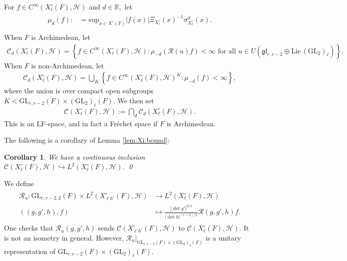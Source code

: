 \documentclass[12pt]{amsart}
\newtheorem{cor}[thm]{Corollary}
\theoremstyle{remark}
\numberwithin{equation}{section}
\newcommand{\GL}{\mathrm{GL}}
\newcommand{\lto}{\longrightarrow}
\newcommand{\RR}{\mathbb{R}}
\newcommand{\quash}[1]{}
\theoremstyle{definition}
\numberwithin{equation}{subsection}
\begin{document}
For $f \in C^\infty(X^\circ_\ell(F),\mathcal{H})$ and $d\in \RR,$ let 
\begin{align*}\begin{split}
    \mu_d(f):&=\mathrm{sup}_{x \in X^\circ(F)}|f(x)|\Xi_{X_\ell^\circ}(x)^{-1}\sigma_{X_\ell^\circ}^d(x).\\
   \quash{\mu_d'(f):&=\mathrm{sup}_{x \in X^\circ(F)}|f(x)|\Xi_{X_\ell^\circ}'(x)^{-1}\sigma_{X_\ell^\circ}'(x)}\end{split}
\end{align*} 
When $F$ is Archimedean, let
\begin{align*} 
\mathcal{C}_{d}(X_\ell^\circ(F),\mathcal{H})=\left\{ f \in C^\infty(X_{\ell}^\circ(F),\mathcal{H}):\mu_{-d}(\mathcal{R}(u)f)<\infty \textrm{ for all }u \in U(\mathfrak{gl}_{r,r-2} \oplus \mathrm{Lie}\, (\GL_{2})_{\ell})\right\}.
\end{align*}
When $F$ is non-Archimedean, let
\begin{align*}
\mathcal{C}_d(X_\ell^\circ(F),\mathcal{H})=\bigcup_{K}\left\{ f \in C^\infty(X_{\ell}^\circ(F),\mathcal{H})^K:\mu_{-d}(f)<\infty\right\},
\end{align*}
where the union is over compact open subgroups $K < \GL_{r,r-2}(F) \times (\GL_2)_\ell(F).$
We then set 
\begin{align*} 
\mathcal{C}(X_\ell^\circ(F),\mathcal{H}):=\bigcap_{d}\mathcal{C}_d(X_\ell^\circ(F),\mathcal{H}).
\end{align*}
This is an LF-space, and in fact a Fr\'echet space if $F$ is Archimedean.

The following is a corollary of Lemma \ref{lem:Xi:bound}:

\begin{cor}\label{lem:L2}
We have a continuous inclusion $\mathcal{C}( X_\ell^\circ(F),\mathcal{H}) \hookrightarrow L^2(X_\ell^\circ(F),\mathcal{H}).$ \qed
\end{cor}

We define 
\begin{align} \label{Ru} \begin{split}
\mathcal{R}_u:\GL_{r,r-2,2}(F) \times L^2(X_{\ell h^{\iota}}^{\circ}(F),\mathcal{H}) &\lto L^2(X_{\ell}^\circ(F),\mathcal{H})\\
((g,g',h),f) &\longmapsto \frac{|\det g'|^{3/2}}{|\det h|^{(r-2)/2}}\mathcal{R}(g,g',h)f.
\end{split}
\end{align}
One checks that $\mathcal{R}_u(g,g',h)$ sends $\mathcal{C}(X_{\ell h^{\iota}}^\circ(F),\mathcal{H})$ to $\mathcal{C}(X^\circ_{\ell}(F),\mathcal{H}).$  It is not an isometry in general.  However,  $\mathcal{R}_u|_{\GL_{r,r-2}(F) \times (\GL_{2})_\ell(F)}$ is a unitary representation of $\GL_{r,r-2}(F) \times (\GL_{2})_\ell(F).$  
\end{document}
